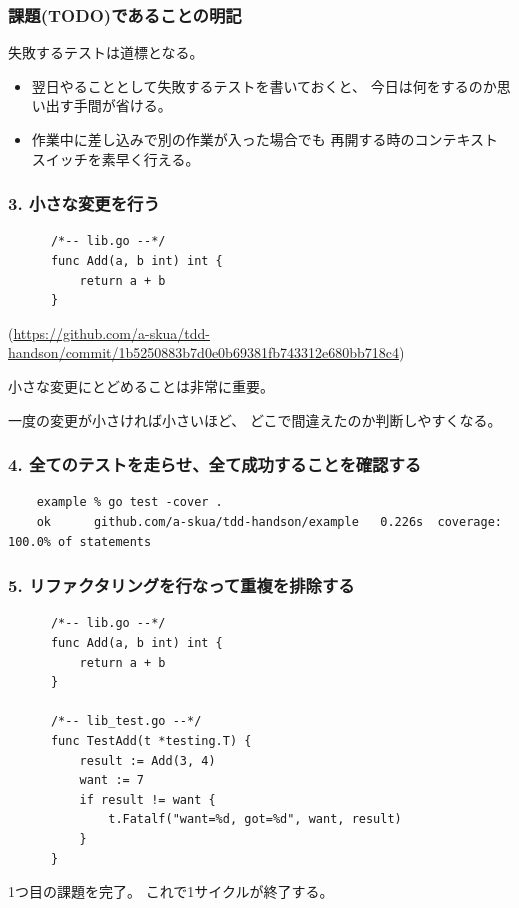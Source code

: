 \documentclass[aspectratio=169]{beamer}
\begin{document}
\begin{frame}\frametitle{課題(TODO)であることの明記}
  失敗するテストは道標となる。
  \begin{itemize}
    \item
      翌日やることとして失敗するテストを書いておくと、
      今日は何をするのか思い出す手間が省ける。

    \item
      作業中に差し込みで別の作業が入った場合でも
      再開する時のコンテキストスイッチを素早く行える。
  \end{itemize}
\end{frame}

\begin{frame}[fragile]\frametitle{3. 小さな変更を行う}
  {
    \scriptsize
    \begin{verbatim}
      /*-- lib.go --*/
      func Add(a, b int) int {
          return a + b
      }
    \end{verbatim}

    {\color{gray} (\url{https://github.com/a-skua/tdd-handson/commit/1b5250883b7d0e0b69381fb743312e680bb718c4})}
  }

  小さな変更にとどめることは非常に重要。

  一度の変更が小さければ小さいほど、
  どこで間違えたのか判断しやすくなる。
\end{frame}

\begin{frame}[fragile]\frametitle{4. 全てのテストを走らせ、全て成功することを確認する}
  \scriptsize
  \color{gray}
  \begin{verbatim}
    example % go test -cover .
    ok  	github.com/a-skua/tdd-handson/example	0.226s	coverage: 100.0% of statements
  \end{verbatim}
\end{frame}

\begin{frame}[fragile]\frametitle{5. リファクタリングを行なって重複を排除する}
  {
    \scriptsize
    \begin{verbatim}
      /*-- lib.go --*/
      func Add(a, b int) int {
          return a + b
      }

      /*-- lib_test.go --*/
      func TestAdd(t *testing.T) {
          result := Add(3, 4)
          want := 7
          if result != want {
              t.Fatalf("want=%d, got=%d", want, result)
          }
      }
    \end{verbatim}
  }
  1つ目の課題を完了。
  これで1サイクルが終了する。
\end{frame}
\end{document}
